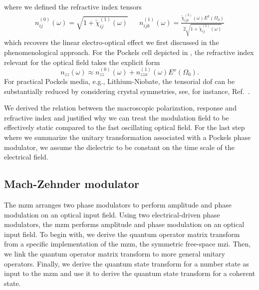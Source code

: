 where we defined the refractive index tensors
\begin{align}
	n^{(0)}_{ij}(\omega)
	=
	\sqrt{1+\tilde{\chi}^{(1)}_{ij}(\omega)}
	&&
	n^{(1)}_{ijk}(\omega)
	=
	\frac{\tilde{\chi}^{(2)}_{ijk}(\omega)
	E^k(\Omega_0)}{2\sqrt{1+\tilde{\chi}^{(1)}_{ij}(\omega)}}
\end{align}
which recovers the linear electro-optical effect we first discussed in the phenomenological approach.
For the Pockels cell depicted in , the refractive index relevant for the optical field takes the explicit form
\begin{equation}
	n_{zz}(\omega)
	\approx
	n^{(0)}_{zz}(\omega)
	+
	n^{(1)}_{zzx}(\omega)
	E^x(\Omega_0)
	.
\end{equation}
For practical Pockels media, e.g., Lithium-Niobate, the tensorial \gls{dof} can be substantially reduced by considering crystal symmetries, see, for instance, Ref.~\cite[p.~237]{Yariv1984}.

We derived the relation between the macroscopic polarization, response and refractive index and justified why we can treat the modulation field to be effectively static compared to the fast oscillating optical field.
For the last step where we summarize the unitary transformation associated with a Pockels phase modulator, we assume the dielectric to be constant on the time scale of the electrical field.

\subsection{Mach-Zehnder modulator}

The \gls{mzm} arranges two phase modulators to perform amplitude and phase modulation on an optical input field.
Using two electrical-driven phase modulators, the \gls{mzm} performs amplitude and phase modulation on an optical input field.
To begin with, we derive the quantum operator matrix transform from a specific implementation of the \gls{mzm}, the symmetric free-space \gls{mzi}.
Then, we link the quantum operator matrix transform to more general unitary operators.
Finally, we derive the quantum state transform for a number state as input to the \gls{mzm} and use it to derive the quantum state transform for a coherent state.


